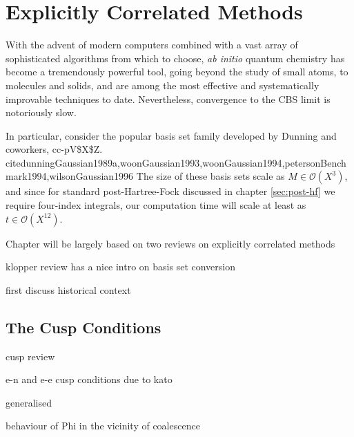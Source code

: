 \chapter{Explicitly Correlated Methods}
\label{chap:explicit}

With the advent of modern computers combined with a vast array of sophisticated algorithms from which to choose, \emph{ab initio} quantum chemistry has become a tremendously powerful tool, going beyond the study of small atoms, to molecules and solids, and are among the most effective and systematically improvable techniques to date. Nevertheless, convergence to the \gls{CBS} limit is notoriously slow.

In particular, consider the popular basis set family developed by Dunning and coworkers, \gls{cc-pV$X$Z}.\\cite{dunningGaussian1989a,woonGaussian1993,woonGaussian1994,petersonBenchmark1994,wilsonGaussian1996}
The size of these basis sets scale as $M\in\mathcal{O}(X^3)$, and since for standard post-Hartree-Fock discussed in chapter \ref{sec:post-hf} we require four-index integrals, our computation time will scale at least as $t\in\mathcal{O}(X^{12})$.\cite{klopperR122007}

Chapter will be largely based on two reviews on explicitly correlated methods \cite{gruneisPerspective2017,hattigExplicitly2012}

klopper review has a nice intro on basis set conversion \cite{klopperR122007}


first discuss historical context

\section{The Cusp Conditions}
\label{sec:cusp}

cusp review \cite{kurokawaChapterTwoGeneral2016}

e-n and e-e cusp conditions due to kato\cite{katoEigenfunctionsManyparticleSystems1957a}

generalised \cite{packCuspConditionsMolecular1966}

behaviour of Phi in the vicinity of coalescence




